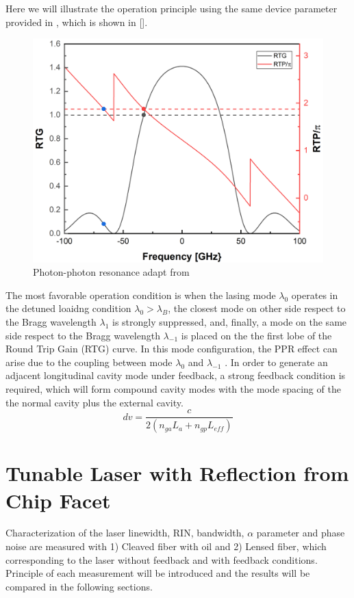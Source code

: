 Here we will illustrate the operation principle using the same device parameter provided in \cite{montrosset2014laser}, which is shown in [].
\begin{figure}[ht]
    \centering
    \includegraphics[width=.6\linewidth]{figures/PP_resonance_operation_principle.png}
    \caption{Photon-photon resonance adapt from \cite{montrosset2014laser}}
    \label{fig:PP_resonance_operation_principle}
\end{figure}

The most favorable operation condition is when the lasing mode $\lambda_0$ operates in the detuned loaidng condition $\lambda_0>\lambda_B$, the closest mode on other side respect to the Bragg wavelength $\lambda_1$ is strongly suppressed, and, finally, a mode on the same side respect to the Bragg wavelength $\lambda_{-1}$ is placed on the the first lobe of the Round Trip Gain (RTG) curve. In this mode configuration, the PPR effect can arise due to the coupling between mode $\lambda_0$ and $\lambda_{-1}$ \cite{montrosset2014laser}. In order to generate an adjacent longitudinal cavity mode under feedback, a strong feedback condition is required, which will form compound cavity modes with the mode spacing of the the normal cavity plus the external cavity.
\begin{equation}
    dv=\frac{c}{2(n_{ga}L_a+n_{gp}L_{eff})}
    \label{mode_spacing}
\end{equation}

\chapter{Tunable Laser with Reflection from Chip Facet}\label{ch:normal_laser}
Characterization of the laser linewidth, RIN, bandwidth, $\alpha$ parameter and phase noise are measured with 1) Cleaved fiber with oil and 2) Lensed fiber, which corresponding to the laser without feedback and with feedback conditions. Principle of each measurement will be introduced and the results will be compared in the following sections.

